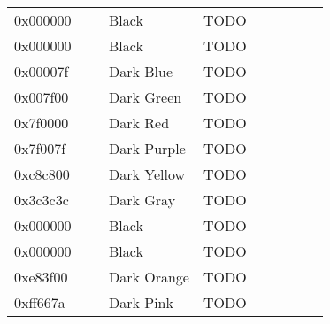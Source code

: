 \begin{longtable}{p{0.3\linewidth} p{0.3\linewidth} p{0.4\linewidth}}
0x000000 &  Black &         TODO\\
0x000000 &  Black &         TODO\\
0x00007f &  Dark Blue &     TODO\\
0x007f00 &  Dark Green &    TODO\\
0x7f0000 &  Dark Red &      TODO\\
0x7f007f &  Dark Purple &   TODO\\
0xc8c800 &  Dark Yellow &   TODO\\
0x3c3c3c &  Dark Gray &     TODO\\
0x000000 &  Black &         TODO\\
0x000000 &  Black &         TODO\\
0xe83f00 &  Dark Orange &   TODO\\
0xff667a &  Dark Pink &     TODO\\

\end{longtable}
